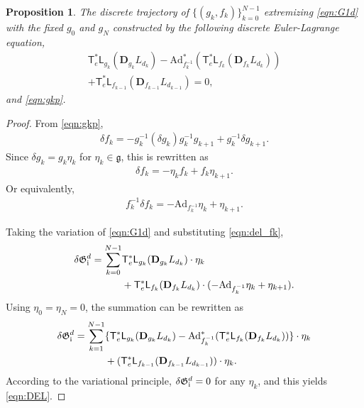 \documentclass[letterpaper, 10pt, conference]{ieeeconf}
\newcommand{\T}{\ensuremath{\mathsf{T}}}
\renewcommand{\L}{\ensuremath{\mathsf{L}}}
\newcommand{\D}{\ensuremath{\mathbf{D}}}
\newcommand{\Ad}{\ensuremath{\mathrm{Ad}}}
\newcommand{\g}{\ensuremath{\mathfrak{g}}}
\newcommand{\RomanNumeralCaps}[1]{\textup{\uppercase\expandafter{\romannumeral#1}}}
\newcommand{\RI}{\RomanNumeralCaps{1}}
\newtheorem{prop}{Proposition}
\begin{document}
\begin{prop}
    The discrete trajectory of $\{(g_k,f_k)\}_{k=0}^{N-1}$ extremizing \eqref{eqn:G1d} with the fixed $g_0$ and $g_N$ constructed by the following discrete Euler-Lagrange equation,
    \begin{gather}
        \T^*_e\L_{g_k}(\D_{g_k} L_{d_k})- \Ad^*_{f_k^{-1}} (\T^*_e\L_{f_k}(\D_{f_k} L_{d_k}))\nonumber \\
        + \T^*_e\L_{f_{k-1}}(\D_{f_{k-1}} L_{d_{k-1}}) =0,\label{eqn:DEL}
    \end{gather}
    and \eqref{eqn:gkp}.
\end{prop}
\begin{proof}
    From \eqref{eqn:gkp},
    \begin{align*}
        \delta f_k = - g_k^{-1}( \delta g_k ) g_k^{-1} g_{k+1} + g_k^{-1}\delta g_{k+1}.
    \end{align*}
    Since $\delta g_k = g_k \eta_k $ for $\eta_k\in \g$, this is rewritten as
    \begin{align*}
        \delta f_k = - \eta_k f_k +f_k \eta_{k+1}.
    \end{align*}
    Or equivalently, 
    \begin{align}
        f_k^{-1}\delta f_k = -\Ad_{f_k^{-1}} \eta_k + \eta_{k+1}.\label{eqn:del_fk}
    \end{align}

    Taking the variation of \eqref{eqn:G1d} and substituting \eqref{eqn:del_fk},
    \begin{align*}
        \delta \mathfrak{G}^d_\RI  = \sum_{k=0}^{N-1}
        & \T^*_e\L_{g_k}(\D_{g_k} L_{d_k}) \cdot \eta_k \\
        & + \T^*_e\L_{f_k}(\D_{f_k} L_{d_k}) \cdot (-\Ad_{f_k^{-1}} \eta_k + \eta_{k+1}).
    \end{align*}
    Using $\eta_0=\eta_N=0$, the summation can be rewritten as
    \begin{align*}
        \delta \mathfrak{G}^d_\RI  = \sum_{k=1}^{N-1}
        & \{ \T^*_e\L_{g_k}(\D_{g_k} L_{d_k})- \Ad^*_{f_k^{-1}} (\T^*_e\L_{f_k}(\D_{f_k} L_{d_k})) \} \cdot \eta_k \\
        & + (\T^*_e\L_{f_{k-1}}(\D_{f_{k-1}} L_{d_{k-1}})) \cdot \eta_{k}.
    \end{align*}
    According to the variational principle, $\delta\mathfrak{G}^d_\RI = 0$ for any $\eta_k$, and this yields \eqref{eqn:DEL}.
\end{proof}
\end{document}

